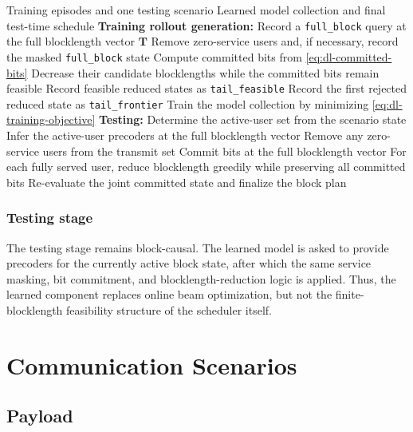 \documentclass[11pt]{article}
\begin{document}
\begin{algorithm}[ht]
\caption{Downlink Training + Testing Method}
\label{alg:dl-train-test}
\begin{algorithmic}[1]
\Require Training episodes and one testing scenario
\Ensure Learned model collection and final test-time schedule
\State \textbf{Training rollout generation:}
    \State Record a \texttt{full\_block} query at the full blocklength vector $\mathbf T$
    \State Remove zero-service users and, if necessary, record the masked \texttt{full\_block} state
    \State Compute committed bits from \eqref{eq:dl-committed-bits}
        \State Decrease their candidate blocklengths while the committed bits remain feasible
        \State Record feasible reduced states as \texttt{tail\_feasible}
        \State Record the first rejected reduced state as \texttt{tail\_frontier}
    \EndIf
\EndFor
\State Train the model collection by minimizing \eqref{eq:dl-training-objective}
\State \textbf{Testing:}
    \State Determine the active-user set from the scenario state
    \State Infer the active-user precoders at the full blocklength vector
    \State Remove any zero-service users from the transmit set
    \State Commit bits at the full blocklength vector
    \State For each fully served user, reduce blocklength greedily while preserving all committed bits
    \State Re-evaluate the joint committed state and finalize the block plan
\EndFor
\end{algorithmic}
\end{algorithm}

\subsubsection{Testing stage}

The testing stage remains block-causal. The learned model is asked to provide
precoders for the currently active block state, after which the same service
masking, bit commitment, and blocklength-reduction logic is applied. Thus, the
learned component replaces online beam optimization, but not the finite-
blocklength feasibility structure of the scheduler itself.

\section{Communication Scenarios}

\subsection{Payload}
\end{document}
